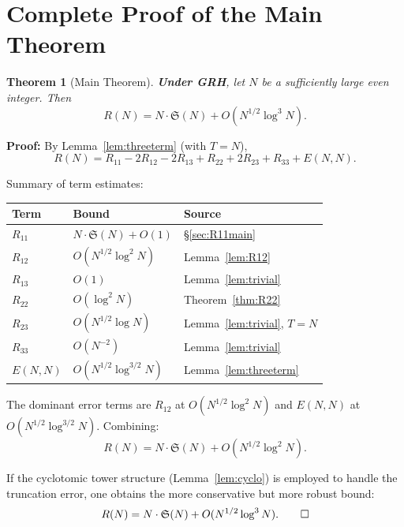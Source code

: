 \documentclass[11pt,a4paper]{article}
\newtheorem{theorem}{Theorem}[section]
\theoremstyle{remark}
\begin{document}
\section{Complete Proof of the Main Theorem}

\begin{theorem}[Main Theorem]\label{thm:main}
\textbf{Under GRH}, let $N$ be a sufficiently large even integer. Then
\begin{equation}\label{eq:main}
R(N) = N \cdot \mathfrak{S}(N) + O(N^{1/2}\log^3 N).
\end{equation}
\end{theorem}

\noindent\textbf{Proof:} By Lemma~\ref{lem:threeterm} (with $T = N$),
\[
R(N) = R_{11} - 2R_{12} - 2R_{13} + R_{22} + 2R_{23} + R_{33} + E(N,N).
\]

\noindent Summary of term estimates:

\begin{center}
\begin{tabularx}{\linewidth}{@{}>{\raggedright\arraybackslash}X>{\raggedright\arraybackslash}X>{\raggedright\arraybackslash}X@{}}
\toprule
\textbf{Term} & \textbf{Bound} & \textbf{Source} \\
\midrule
$R_{11}$ & $N \cdot \mathfrak{S}(N) + O(1)$ & \S\ref{sec:R11main} \\
$R_{12}$ & $O(N^{1/2}\log^2 N)$ & Lemma~\ref{lem:R12} \\
$R_{13}$ & $O(1)$ & Lemma~\ref{lem:trivial} \\
$R_{22}$ & $O(\log^2 N)$ & Theorem~\ref{thm:R22} \\
$R_{23}$ & $O(N^{1/2}\log N)$ & Lemma~\ref{lem:trivial}, $T = N$ \\
$R_{33}$ & $O(N^{-2})$ & Lemma~\ref{lem:trivial} \\
$E(N,N)$ & $O(N^{1/2}\log^{3/2} N)$ & Lemma~\ref{lem:threeterm} \\
\bottomrule
\end{tabularx}
\end{center}

The dominant error terms are $R_{12}$ at $O(N^{1/2}\log^2 N)$ and $E(N,N)$ at $O(N^{1/2}\log^{3/2} N)$. Combining:
\[
R(N) = N \cdot \mathfrak{S}(N) + O(N^{1/2}\log^2 N).
\]

If the cyclotomic tower structure (Lemma~\ref{lem:cyclo}) is employed to handle the truncation error, one obtains the more conservative but more robust bound:
\[
R(N) = N \cdot \mathfrak{S}(N) + O(N^{1/2}\log^3 N). \qed
\]
\end{document}

